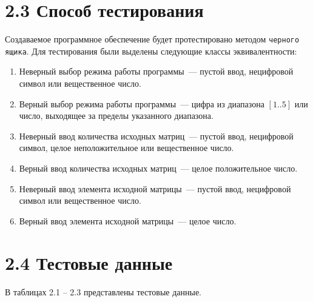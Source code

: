 \documentclass[12pt, a4paper]{report}
\begin{document}
	\section*{2.3 Способ тестирования}
	
	Создаваемое программное обеспечение будет протестировано методом \verb|черного ящика|. Для тестирования были выделены следующие классы эквивалентности:
	\begin{enumerate}
		\item Неверный выбор режима работы программы~--- пустой ввод, нецифровой символ или вещественное число.
		\item Верный выбор режима работы программы~--- цифра из диапазона $[1..5]$ или число, выходящее за пределы указанного диапазона.
		\item Неверный ввод количества исходных матриц~--- пустой ввод, нецифровой символ, целое неположительное или вещественное число.
		\item Верный ввод количества исходных матриц~--- целое положительное число.
		\item Неверный ввод элемента исходной матрицы~--- пустой ввод, нецифровой символ или вещественное число.
		\item Верный ввод элемента исходной матрицы~--- целое число.
	\end{enumerate}
	\newpage
	\section*{2.4 Тестовые данные}
	
	В таблицах 2.1 -- 2.3 представлены тестовые данные.
	
\end{document}
